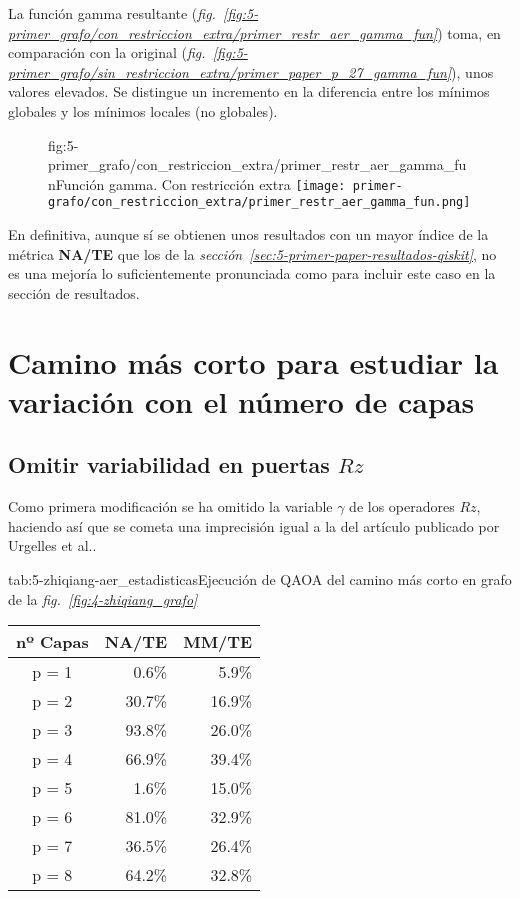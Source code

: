 La función gamma resultante (\textit{fig.~\ref{fig:5-primer_grafo/con_restriccion_extra/primer_restr_aer_gamma_fun}}) toma, en comparación con la original (\textit{fig.~\ref{fig:5-primer_grafo/sin_restriccion_extra/primer_paper_p_27_gamma_fun}}), unos valores elevados.
Se distingue un incremento en la diferencia entre los mínimos globales y los mínimos locales (no globales).

\begin{figure}[Resultados QAOA {--} artículo de Shan et al. {--} función gamma con restricción extra]{fig:5-primer_grafo/con_restriccion_extra/primer_restr_aer_gamma_fun}{Función gamma. Con restricción extra}
  \centering
  \texttt{[image: primer-grafo/con\_restriccion\_extra/primer\_restr\_aer\_gamma\_fun.png]}
\end{figure}

En definitiva, aunque sí se obtienen unos resultados con un mayor índice de la métrica \textbf{NA/TE} que los de la \textit{sección~\ref{sec:5-primer-paper-resultados-qiskit}}, no es una mejoría lo suficientemente pronunciada como para incluir este caso en la sección de resultados.


\section{Camino más corto para estudiar la variación con el número de capas\label{sec:8-zhiqiang}}

\subsection{Omitir variabilidad en puertas $Rz$}

Como primera modificación se ha omitido la variable $\gamma$ de los operadores $Rz$, haciendo así que se cometa una imprecisión igual a la del artículo publicado por Urgelles et al.\cite{multi-objective_routing_optimization}.

\begin{table}[Resultados QAOA {--} artículo de Shan et al. {--} puertas $Rz$ constantes]{tab:5-zhiqiang-aer_estadisticas}{Ejecución de QAOA del camino más corto en grafo de la \textit{fig.~\ref{fig:4-zhiqiang_grafo}}}
  \centering
  \begin{tabular}{|c|r|r|}
    \hline
    \textbf{nº Capas} & \textbf{NA/TE} & \textbf{MM/TE} \\ \hline
    p = 1 &  0.6\% &  5.9\% \\ \hline
    p = 2 & 30.7\% & 16.9\% \\ \hline
    p = 3 & 93.8\% & 26.0\% \\ \hline
    p = 4 & 66.9\% & 39.4\% \\ \hline
    p = 5 &  1.6\% & 15.0\% \\ \hline
    p = 6 & 81.0\% & 32.9\% \\ \hline
    p = 7 & 36.5\% & 26.4\% \\ \hline
    p = 8 & 64.2\% & 32.8\% \\ \hline
  \end{tabular}
\end{table}

